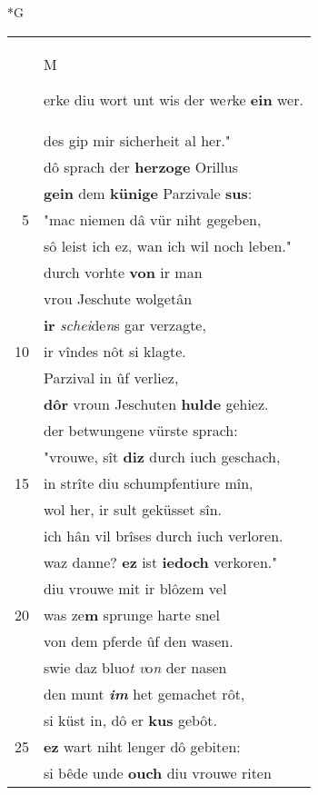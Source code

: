 \documentclass[8pt,a4paper,notitlepage]{article}
\begin{document}
\newpage
\begin{table}[ht]
\begin{minipage}[t]{0.5\linewidth}
\small
\begin{center}*G
\end{center}
\begin{tabular}{rl}
 & \begin{large}M\end{large}erke diu wort unt wis der we\textit{r}ke \textbf{ein} wer.\\ 
 & des gip mir sicherheit al her."\\ 
 & dô sprach der \textbf{herzoge} Orillus\\ 
 & \textbf{gein} dem \textbf{künige} Parzivale \textbf{sus}:\\ 
5 & "mac niemen dâ vür niht gegeben,\\ 
 & sô leist ich ez, wan ich wil noch leben."\\ 
 & durch vorhte \textbf{von} ir man\\ 
 & vrou Jeschute wolgetân\\ 
 & \textbf{ir} \textit{schei}de\textit{n}s gar verzagte,\\ 
10 & ir vîndes nôt si klagte.\\ 
 & Parzival in ûf verliez,\\ 
 & \textbf{dôr} vroun Jeschuten \textbf{hulde} gehiez.\\ 
 & der betwungene vürste sprach:\\ 
 & "vrouwe, sît \textbf{diz} durch iuch geschach,\\ 
15 & in strîte diu schumpfentiure mîn,\\ 
 & wol her, ir sult geküsset sîn.\\ 
 & ich hân vil brîses durch iuch verloren.\\ 
 & waz danne? \textbf{ez} ist \textbf{iedoch} verkoren."\\ 
 & diu vrouwe mit ir blôzem vel\\ 
20 & was ze\textbf{m} sprunge harte snel\\ 
 & von dem pferde ûf den wasen.\\ 
 & swie daz bluo\textit{t} \textit{v}o\textit{n} der nasen\\ 
 & den munt \textit{\textbf{im}} het gemachet rôt,\\ 
 & si küst in, dô er \textbf{kus} gebôt.\\ 
25 & \textbf{ez} wart niht lenger dô gebiten:\\ 
 & si bêde unde \textbf{ouch} diu vrouwe riten\\ 

\end{tabular}
\end{minipage}
\end{table}
\end{document}
